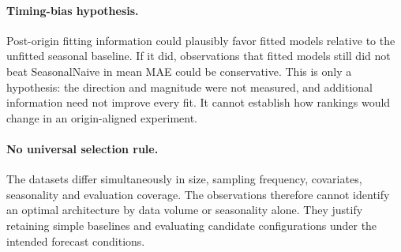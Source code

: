 \documentclass[10pt,a4paper]{article}
\begin{document}
\paragraph{Timing-bias hypothesis.} Post-origin fitting information could plausibly favor fitted models relative to the unfitted seasonal baseline. If it did, observations that fitted models still did not beat SeasonalNaive in mean MAE could be conservative. This is only a hypothesis: the direction and magnitude were not measured, and additional information need not improve every fit. It cannot establish how rankings would change in an origin-aligned experiment.

\paragraph{No universal selection rule.} The datasets differ simultaneously in size, sampling frequency, covariates, seasonality and evaluation coverage. The observations therefore cannot identify an optimal architecture by data volume or seasonality alone. They justify retaining simple baselines and evaluating candidate configurations under the intended forecast conditions.
\end{document}
